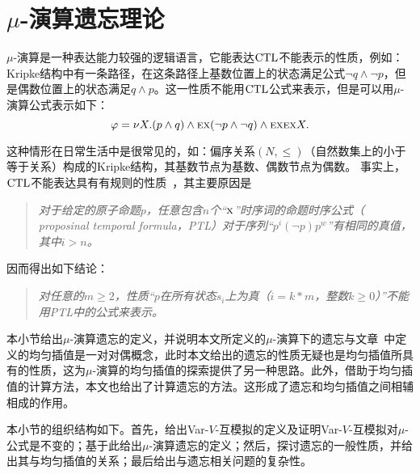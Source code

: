 \section{$\mu$-演算遗忘理论}
\label{chapter03:sec:muforget}
$\mu$-演算是一种表达能力较强的逻辑语言，它能表达$\textrm{CTL}$不能表示的性质，例如：Kripke结构中有一条路径，在这条路径上基数位置上的状态满足公式$\neg q \wedge \neg p$，但是偶数位置上的状态满足$q \wedge p$。这一性质不能用$\textrm{CTL}$公式来表示，但是可以用$\mu$-演算公式表示如下：
$$\varphi = \nu X.(p \wedge q) \wedge \textsc{e} \textsc{x}(\neg p \wedge \neg q) \wedge \textsc{e} \textsc{x} \textsc{e} \textsc{x} X.$$

这种情形在日常生活中是很常见的，如：偏序关系$(N, \leq)$（自然数集上的小于等于关系）构成的Kripke结构，其基数节点为基数、偶数节点为偶数。
事实上，$\textrm{CTL}$不能表达具有有规则的性质~\cite{DBLP:journals/iandc/Wolper83}，其主要原因是
\begin{quote}
	\emph{对于给定的原子命题$p$，任意包含$n$个“$\textsc{x}$”时序词的命题时序公式（ proposinal temporal formula，PTL）对于序列“$p^i(\neg p) p^w$”有相同的真值，其中$i > n$。%
	}
\end{quote}

因而得出如下结论：
\begin{quote}
	\emph{对任意的$m\geq 2$，性质“$p$在所有状态$s_i$上为真（$i = k*m$，整数$k\geq 0$）”不能用PTL中的公式来表示。
	}
\end{quote}





本小节给出$\mu$-演算遗忘的定义，并说明本文所定义的$\mu$-演算下的遗忘与文章~\cite{d2006modal}中定义的均匀插值是一对对偶概念，此时本文给出的遗忘的性质无疑也是均匀插值所具有的性质，这为$\mu$-演算的均匀插值的探索提供了另一种思路。此外，借助于均匀插值的计算方法，本文也给出了计算遗忘的方法。这形成了遗忘和均匀插值之间相辅相成的作用。

本小节的组织结构如下。首先，给出Var-$V$-互模拟的定义及证明Var-$V$-互模拟对$\mu$-公式是不变的；基于此给出$\mu$-演算遗忘的定义；然后，探讨遗忘的一般性质，并给出其与均匀插值的关系；最后给出与遗忘相关问题的复杂性。

